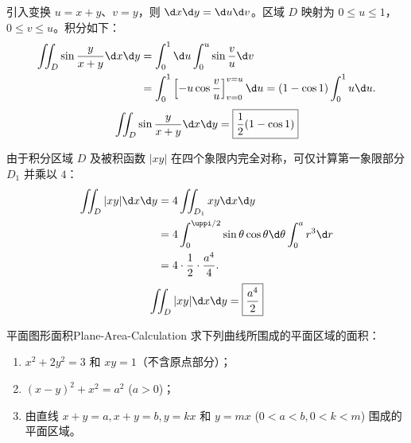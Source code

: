 \begin{solution}

    引入变换 $u = x+y$、$v = y$，则 $\d x \d y = \d u \d v$。区域 $D$ 映射为 $0 \leqslant u \leqslant 1$，$0 \leqslant v \leqslant u$。积分如下：
    \begin{equation}
        \begin{aligned}
            \iint_D \sin \frac{y}{x+y} \d x \d y & = \int_0^1 \d u \int_0^u \sin \frac{v}{u} \d v                                                 \\
                                                 & = \int_0^1 \left[ -u \cos \frac{v}{u} \right]_{v=0}^{v=u} \d u = (1 - \cos 1) \int_0^1 u \d u.
        \end{aligned}
    \end{equation}
    \begin{equation}
        \iint_D \sin \frac{y}{x+y} \d x \d y = \boxed{\frac{1}{2}(1 - \cos 1)}
    \end{equation}


    由于积分区域 $D$ 及被积函数 $|xy|$ 在四个象限内完全对称，可仅计算第一象限部分 $D_1$ 并乘以 $4$：
    \begin{equation}
        \begin{aligned}
            \iint_D |xy| \d x \d y & = 4 \iint_{D_1} xy \d x \d y                                                                   \\
                                   & = 4 \int_0^{\uppi/2} \sin \theta \cos \theta \d \theta \int_0^a r^3 \d r \label{eq:int-9-step} \\
                                   & = 4 \cdot \frac{1}{2} \cdot \frac{a^4}{4}.
        \end{aligned}
    \end{equation}
    \begin{equation}
        \iint_D |xy| \d x \d y = \boxed{\frac{a^4}{2}}
    \end{equation}
\end{solution}


\begin{problem}{平面图形面积}{Plane-Area-Calculation}
    求下列曲线所围成的平面区域的面积：
    \begin{enumerate}
        \item $x^2 + 2y^2 = 3$ 和 $xy = 1$（不含原点部分）；
        \item $(x - y)^2 + x^2 = a^2$ ($a > 0$)；
        \item 由直线 $x + y = a, x + y = b, y = kx$ 和 $y = m x$ ($0 < a < b, 0 < k < m$) 围成的平面区域。
    \end{enumerate}
\end{problem}

